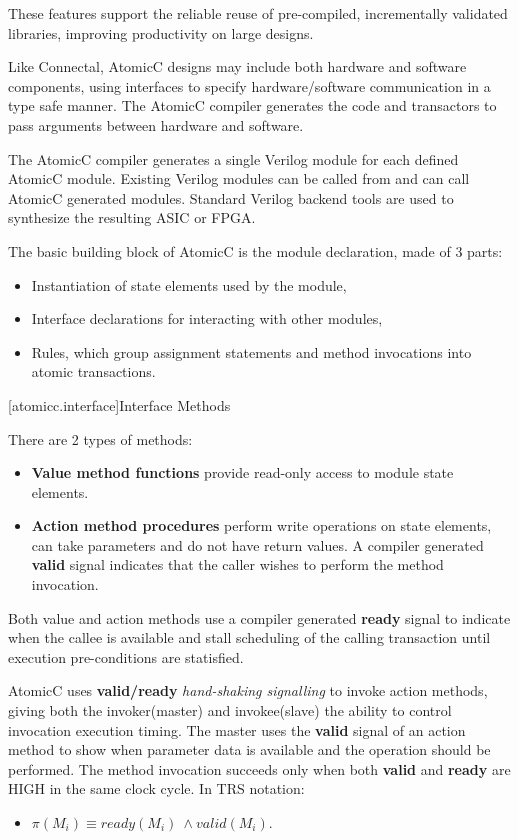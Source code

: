 These features support the reliable reuse of pre-compiled, incrementally validated
libraries, improving productivity on large designs.

Like Connectal\cite{king2015software}, AtomicC designs may include both hardware and
software components, using interfaces to specify hardware/software communication
in a type safe manner. The AtomicC compiler generates the code and transactors to pass
arguments between hardware and software.

The AtomicC compiler 
generates a single Verilog module for each defined AtomicC module.
Existing Verilog modules can be called from and can call AtomicC
generated modules.
Standard Verilog backend tools are used to synthesize
the resulting ASIC or FPGA.

The basic building block of AtomicC is the module declaration, made of 3 parts:
\begin{itemize}
\item Instantiation of state elements used by the module,
\item Interface declarations for interacting with other modules,
\item Rules, which group assignment statements and method invocations into atomic transactions.
\end{itemize}

[atomicc.interface]{Interface Methods}

There are 2 types of methods:
\begin{itemize}
\item \textbf{Value method functions} provide read-only access to module state elements.
\item \textbf{Action method procedures} perform write operations on state elements,
can take parameters and do not have return values.
A compiler generated
\textbf{valid} signal indicates that the caller wishes to perform the method invocation.
\end{itemize}

Both value and action methods use a compiler generated \textbf{ready} signal
to indicate when the callee is available and
stall scheduling of the calling transaction until
execution pre-conditions are statisfied.

AtomicC uses \textbf{valid/ready} \textit{hand-shaking signalling}
\cite{Fletcher2009, AXISpec} to invoke action methods,
giving both the invoker(master) and invokee(slave) the ability to control invocation
execution timing.
The master uses the \textbf{valid} signal
of an action method to show when parameter data is available
and the operation should be performed.
The method invocation succeeds only when
both \textbf{valid} and \textbf{ready} are HIGH in the same clock cycle.
\newline
In TRS notation\cite[p.~22]{Hoe:Thesis}:
\begin{itemize}[label= ]
\item $\pi(M_{i}) \equiv ready(M_{i})\ \wedge valid(M_{i})$.
\end{itemize}

